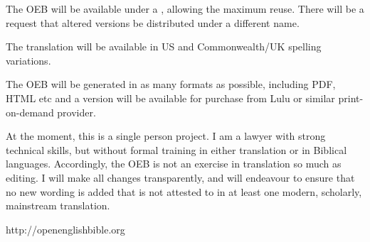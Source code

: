 
The OEB will be available under a
\from[5],
allowing the maximum reuse. There will be a request that altered
versions be distributed under a different name.


The translation will be available in US and Commonwealth/UK
spelling variations.


The OEB will be generated in as many formats as possible, including
PDF, HTML etc and a version will be available for purchase from
Lulu or similar print-on-demand provider.


At the moment, this is a single person project. I am a lawyer with
strong technical skills, but without formal training in either
translation or in Biblical languages. Accordingly, the OEB is not
an exercise in translation so much as editing. I will make all
changes transparently, and will endeavour to ensure that no new
wording is added that is not attested to in at least one modern,
scholarly, mainstream translation.


http://openenglishbible.org

\marking[RAChapter]{ } \marking[RABook]{ } \marking[RASection]{ }